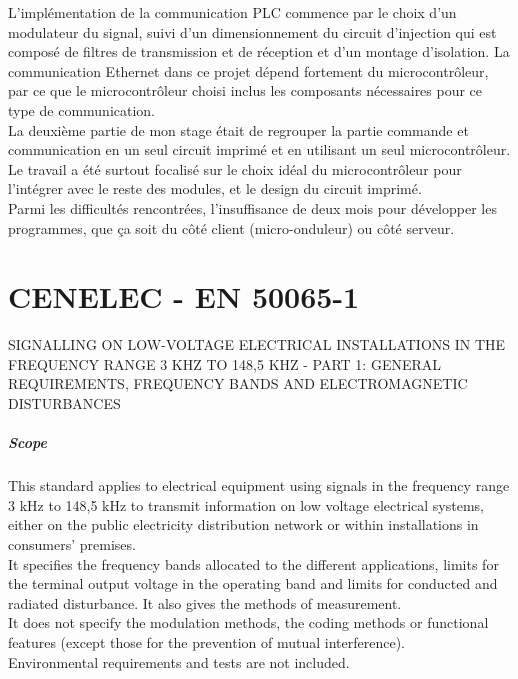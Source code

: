 \documentclass[11pt, a4paper, twoside]{book}
\begin{document}
{L'implémentation de la communication PLC commence par le choix d'un modulateur du signal, suivi d'un dimensionnement du circuit d'injection qui est composé de filtres de transmission et de réception et d'un montage d'isolation.
La communication Ethernet dans ce projet dépend fortement du microcontrôleur, par ce que le microcontrôleur choisi inclus les composants nécessaires pour ce type de communication.\\

La deuxième partie de mon stage était de regrouper la partie commande et communication en un seul circuit imprimé et en utilisant un seul microcontrôleur. Le travail a été surtout focalisé sur le choix idéal du microcontrôleur pour l'intégrer avec le reste des modules, et le design du circuit imprimé.\\

Parmi les difficultés rencontrées, l'insuffisance de deux mois pour développer les programmes, que ça soit du côté client (micro-onduleur) ou côté serveur.

\appendix
\chapter{CENELEC - EN 50065-1}
SIGNALLING ON LOW-VOLTAGE ELECTRICAL INSTALLATIONS IN THE FREQUENCY RANGE 3 KHZ TO 148,5 KHZ - PART 1: GENERAL REQUIREMENTS, FREQUENCY BANDS AND ELECTROMAGNETIC DISTURBANCES\\

\paragraph{Scope}
This standard applies to electrical equipment using signals in the frequency range 3 kHz to 148,5 kHz to transmit information on low voltage electrical systems, either on the public electricity distribution network or within installations in consumers' premises.\\

It specifies the frequency bands allocated to the different applications, limits for the terminal output voltage in the operating band and limits for conducted and radiated disturbance. It also gives the methods of measurement.\\

It does not specify the modulation methods, the coding methods or functional features (except those for the prevention of mutual interference).\\

Environmental requirements and tests are not included.\\

}
\end{document}
